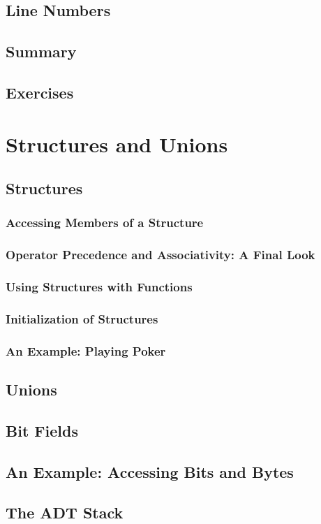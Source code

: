 \documentclass[12pt]{book}
\begin{document}
\section{Line Numbers}
\section{Summary}
\section{Exercises}

\chapter{Structures and Unions}

\section{Structures}
\subsection{Accessing Members of a Structure}
\subsection{Operator Precedence and Associativity: A Final Look}
\subsection{Using Structures with Functions}
\subsection{Initialization of Structures}
\subsection{An Example: Playing Poker}
\section{Unions}
\section{Bit Fields}
\section{An Example: Accessing Bits and Bytes}
\section{The ADT Stack}
\end{document}
